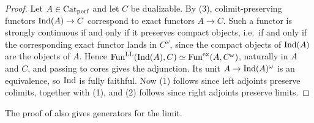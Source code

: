 	\begin{proof}
		Let $A \in {\textup{Cat}}_{\operatorname{perf}}$ and let $C$ be dualizable. By (3), colimit-preserving functors $\operatorname{Ind}(A) \to C$ correspond to exact functors $A \to C$. Such a functor is strongly continuous if and only if it preserves compact objects, i.e.\ if and only if the corresponding exact functor lands in $C^{\omega}$, since the compact objects of $\operatorname{Ind}(A)$ are the objects of $A$. Hence $\operatorname{Fun}^{\mathrm{LL}}(\operatorname{Ind}(A),C) \simeq \operatorname{Fun}^{\operatorname{ex}}(A,C^{\omega})$, naturally in $A$ and $C$, and passing to cores gives the adjunction. Its unit $A \to \operatorname{Ind}(A)^{\omega}$ is an equivalence, so $\operatorname{Ind}$ is fully faithful. Now (1) follows since left adjoints preserve colimits, together with (1), and (2) follows since right adjoints preserve limits.
	\end{proof}

	The proof of  also gives generators for the limit.

